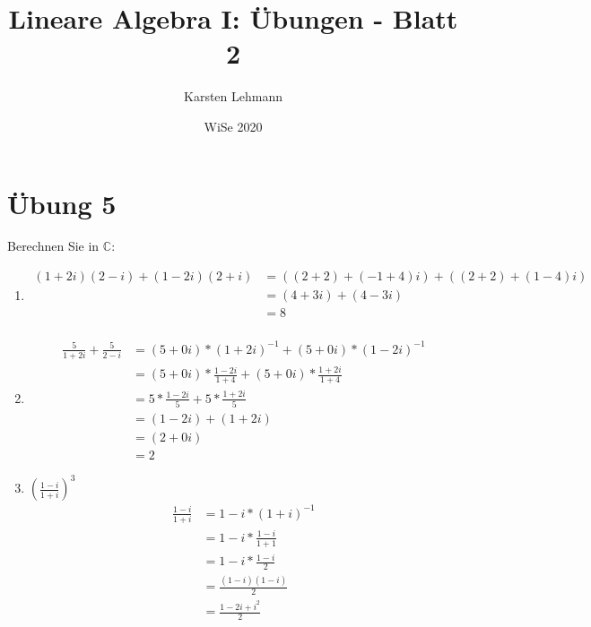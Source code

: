 \documentclass{article}
\author{Karsten Lehmann}
\date{WiSe 2020}
\title{Lineare Algebra I: Übungen - Blatt 2}
\begin{document}
\maketitle

\vfill

\newpage

\section*{Übung 5}

Berechnen Sie in $\mathbb{C}$:

\begin{enumerate}
\item
  \begin{align*}
    (1 + 2i)(2 - i) + (1 - 2i)(2 + i) &= ((2 + 2) + (-1 + 4)i) + ((2 + 2) + (1 - 4)i) \\
                                      &= (4 + 3i) + (4 - 3i) \\
                                      &= 8 \\
  \end{align*}
\item
  \begin{align*}
    \frac{5}{1 + 2i} + \frac{5}{2 - i} &= (5 + 0i) * (1 + 2i)^{-1} + (5 + 0i) * (1 - 2i)^{-1}  \\
                                       &= (5 + 0i) * \frac{1 - 2i}{1 + 4} + (5 + 0i) * \frac{1 + 2i}{1 + 4} \\ 
                                       &= 5 * \frac{1 - 2i}{5} + 5 * \frac{1 + 2i}{5} \\
                                       &= (1 - 2i) + (1 + 2i) \\
                                       &= (2 + 0 i) \\
                                       &= 2
  \end{align*}
\item $\left(\frac{1 - i}{1 + i}\right)^3$
  \begin{align*}
    \frac{1 - i}{1 + i}                &= 1 - i * (1 + i)^{-1} \\\
                                       &= 1 - i * \frac{1 - i}{1 + 1} \\
                                       &= 1 - i * \frac{1 - i}{2} \\
                                       &= \frac{(1 - i)(1 - i)}{2} \\
                                       &= \frac{1 - 2i + i^2}{2} \\

\end{align*}
\end{enumerate}
\end{document}
